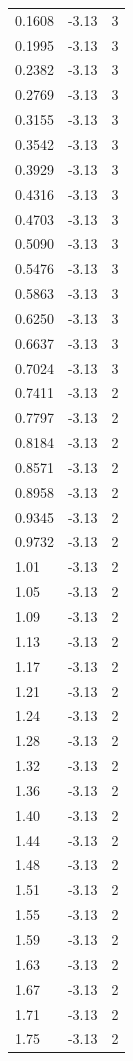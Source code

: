 \begin{longtable}{lrr}
  0.1608 & -3.13 & 3 \\
  0.1995 & -3.13 & 3 \\
  0.2382 & -3.13 & 3 \\
  0.2769 & -3.13 & 3 \\
  0.3155 & -3.13 & 3 \\
  0.3542 & -3.13 & 3 \\
  0.3929 & -3.13 & 3 \\
  0.4316 & -3.13 & 3 \\
  0.4703 & -3.13 & 3 \\
  0.5090 & -3.13 & 3 \\
  0.5476 & -3.13 & 3 \\
  0.5863 & -3.13 & 3 \\
  0.6250 & -3.13 & 3 \\
  0.6637 & -3.13 & 3 \\
  0.7024 & -3.13 & 3 \\
  0.7411 & -3.13 & 2 \\
  0.7797 & -3.13 & 2 \\
  0.8184 & -3.13 & 2 \\
  0.8571 & -3.13 & 2 \\
  0.8958 & -3.13 & 2 \\
  0.9345 & -3.13 & 2 \\
  0.9732 & -3.13 & 2 \\
  1.01 & -3.13 & 2 \\
  1.05 & -3.13 & 2 \\
  1.09 & -3.13 & 2 \\
  1.13 & -3.13 & 2 \\
  1.17 & -3.13 & 2 \\
  1.21 & -3.13 & 2 \\
  1.24 & -3.13 & 2 \\
  1.28 & -3.13 & 2 \\
  1.32 & -3.13 & 2 \\
  1.36 & -3.13 & 2 \\
  1.40 & -3.13 & 2 \\
  1.44 & -3.13 & 2 \\
  1.48 & -3.13 & 2 \\
  1.51 & -3.13 & 2 \\
  1.55 & -3.13 & 2 \\
  1.59 & -3.13 & 2 \\
  1.63 & -3.13 & 2 \\
  1.67 & -3.13 & 2 \\
  1.71 & -3.13 & 2 \\
  1.75 & -3.13 & 2 \\

\end{longtable}
